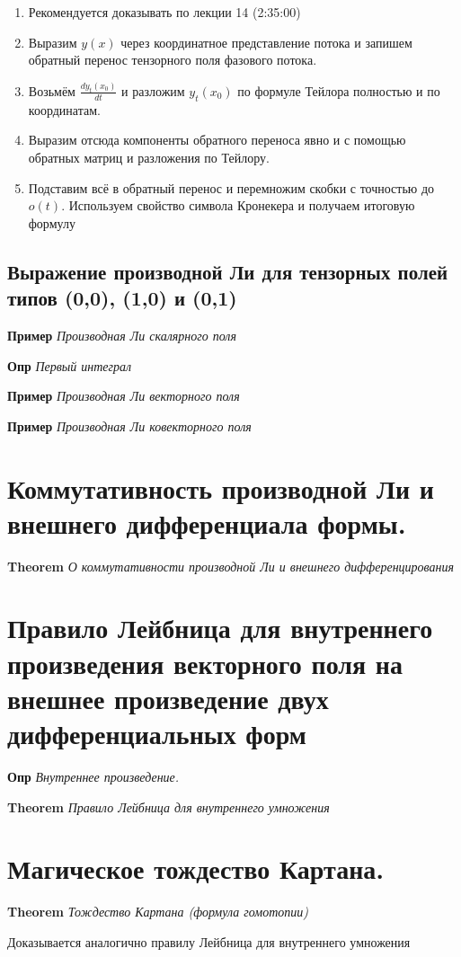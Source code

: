 \documentclass[a4paper, 14pt]{article}
\begin{document}
    \begin{enumerate}
        \item Рекомендуется доказывать по лекции 14 (2:35:00)
        \item Выразим $y(x)$ через координатное представление потока и запишем обратный перенос тензорного поля
        фазового потока.
        \item Возьмём $\frac{d y_t (x_0)}{dt}$ и разложим $y_t (x_0)$ по формуле Тейлора полностью и по координатам.
        \item Выразим отсюда компоненты обратного переноса явно и с помощью обратных матриц и разложения по Тейлору.
        \item Подставим всё в обратный перенос и перемножим скобки с точностью до $o(t)$.
        Используем свойство символа Кронекера и получаем итоговую формулу
    \end{enumerate}
    
    \subsection{Выражение производной Ли для тензорных полей типов (0,0), (1,0) и (0,1)}
    
    \textbf{Пример} \textit{Производная Ли скалярного поля}
    
    \textbf{Опр} \textit{Первый интеграл}
    
    \textbf{Пример} \textit{Производная Ли векторного поля}
    
    \textbf{Пример} \textit{Производная Ли ковекторного поля}
    
    \section{Коммутативность производной Ли и внешнего дифференциала формы.}
    
    \textbf{Theorem} \textit{О коммутативности производной Ли и внешнего дифференцирования}
    
    \section{Правило Лейбница для внутреннего произведения векторного поля на внешнее произведение двух
    дифференциальных форм}
    
    \textbf{Опр} \textit{Внутреннее произведение.}
    
    \textbf{Theorem} \textit{Правило Лейбница для внутреннего умножения}
    
    \section{Магическое тождество Картана.}
    
    \textbf{Theorem} \textit{Тождество Картана (формула гомотопии)}
    
    Доказывается аналогично правилу Лейбница для внутреннего умножения
\end{document}
